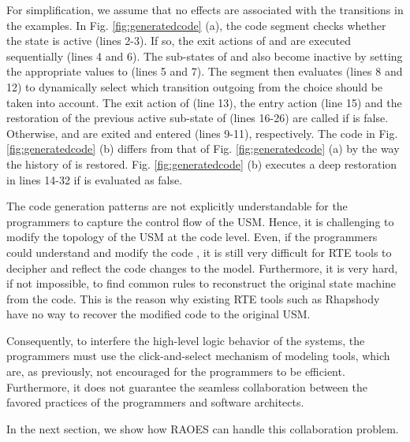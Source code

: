 


For simplification, we assume that no effects are associated with the transitions in the examples.
In Fig. \ref{fig:generatedcode} (a), the code segment checks whether the state  is active (lines 2-3).
If so, the exit actions of  and  are executed sequentially (lines 4 and 6).
The sub-states of  and  also become inactive by setting the appropriate values to  (lines 5 and 7).
The segment then evaluates  (lines 8 and 12) to dynamically select which transition outgoing from the choice  should be taken into account.
The exit action of  (line 13), the entry action (line 15) and the restoration of the previous active sub-state of  (lines 16-26) are called if  is false. 
Otherwise,  and  are exited and entered (lines 9-11), respectively.
The code in Fig. \ref{fig:generatedcode} (b) differs from that of Fig. \ref{fig:generatedcode} (a) by the way the history of  is restored.
Fig. \ref{fig:generatedcode} (b) executes a deep restoration in lines 14-32 if  is evaluated as false.

The code generation patterns are not explicitly understandable for the programmers to capture the control flow of the USM. %
Hence, it is challenging to modify the topology of the USM at the code level. 
Even, if the programmers could understand and modify the code %
, it is still very difficult for RTE tools to decipher and reflect the code changes to the model.
Furthermore, 
it is very hard, if not impossible, to find common rules to reconstruct the original state machine from the code. 
This is the reason why existing RTE tools such as Rhapshody 
have no way to recover the modified code to the original USM.

Consequently, to interfere the high-level logic behavior of the systems, the programmers must use the click-and-select mechanism of modeling tools, which are, as previously, not encouraged for the programmers to be efficient. 
Furthermore, it does not guarantee the seamless collaboration between the favored practices of the programmers and software architects.  

In the next section, we show how RAOES can handle this collaboration problem.